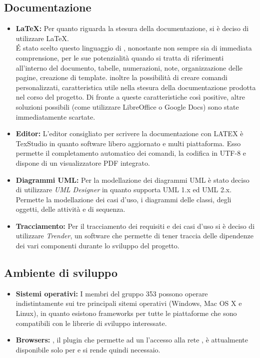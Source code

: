 \documentclass[NormeDiProgetto.tex]{subfiles}
\begin{document}
	\subsection{Documentazione}
	\begin{itemize}
		\item \textbf{\LaTeX:} Per quanto riguarda la stesura della documentazione, si è deciso di
		utilizzare \LaTeX. \\
		\'{E}	stato scelto questo linguaggio di , nonostante
		non sempre sia di immediata comprensione, per le sue potenzialità quando
		si tratta di riferimenti all'interno del documento, tabelle, numerazioni,
		note, organizzazione delle pagine, creazione di template. inoltre
		la possibilità di creare comandi personalizzati, caratteristica utile nella
		stesura della documentazione prodotta nel corso del progetto. Di fronte a
		queste caratteristiche così positive, altre soluzioni possibili (come utilizzare
		LibreOffice o Google Docs) sono state immediatamente scartate.
		\item \textbf{Editor:} L'editor consigliato per scrivere la documentazione con LATEX è
		TexStudio in quanto software libero aggiornato e multi piattaforma. Esso
		permette il completamento automatico dei comandi, la codifica in UTF-8 e
		dispone di un visualizzatore PDF integrato.
		\item \textbf{Diagrammi UML:} Per la modellazione dei diagrammi UML è stato deciso di utilizzare \emph{UML Designer} in quanto supporta UML 1.x ed UML 2.x. Permette la modellazione dei casi d'uso, i diagrammi delle classi, degli oggetti, delle attività	e di sequenza.
		\item \textbf{Tracciamento:} Per il tracciamento dei requisiti e dei casi d'uso si è deciso di utilizzare \emph{Trender}, un software che permette di tener traccia delle dipendenze dei vari componenti durante lo sviluppo del progetto.
	\end{itemize}
	\subsection{Ambiente di sviluppo}
	\begin{itemize}
		\item \textbf{Sistemi operativi:} I membri del gruppo 353 possono operare indistintamente sui tre principali sitemi operativi (Windows, Mac OS X e Linux), in quanto esistono frameworks per tutte le piattaforme che sono compatibili con le librerie di sviluppo interessate.
		\item \textbf{Browsers:} , il plugin che permette ad un  l'accesso alla rete , è attualmente disponibile solo per  e si rende quindi necessaio.
	\end{itemize}
\end{document}
